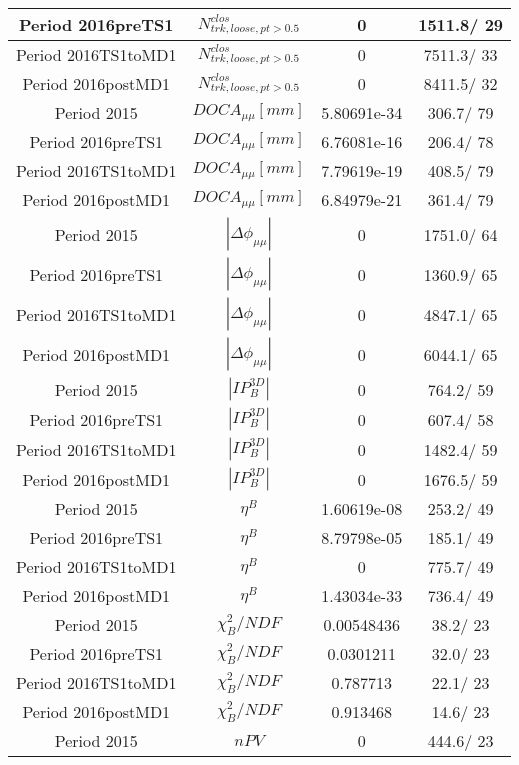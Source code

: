\documentclass{article}
\begin{document}
\begin{longtable}{c|c|c|c}
\hline
 Period 2016preTS1 & $N^{clos}_{trk, loose, pt>0.5}$ & 0 & 1511.8/ 29\\
\hline
 Period 2016TS1toMD1 & $N^{clos}_{trk, loose, pt>0.5}$ & 0 & 7511.3/ 33\\
\hline
 Period 2016postMD1 & $N^{clos}_{trk, loose, pt>0.5}$ & 0 & 8411.5/ 32\\
\hline
 Period 2015 & $DOCA_{\mu\mu} [mm]$ & 5.80691e-34 & 306.7/ 79\\
\hline
 Period 2016preTS1 & $DOCA_{\mu\mu} [mm]$ & 6.76081e-16 & 206.4/ 78\\
\hline
 Period 2016TS1toMD1 & $DOCA_{\mu\mu} [mm]$ & 7.79619e-19 & 408.5/ 79\\
\hline
 Period 2016postMD1 & $DOCA_{\mu\mu} [mm]$ & 6.84979e-21 & 361.4/ 79\\
\hline
 Period 2015 & $|\Delta\phi_{\mu\mu}|$ & 0 & 1751.0/ 64\\
\hline
 Period 2016preTS1 & $|\Delta\phi_{\mu\mu}|$ & 0 & 1360.9/ 65\\
\hline
 Period 2016TS1toMD1 & $|\Delta\phi_{\mu\mu}|$ & 0 & 4847.1/ 65\\
\hline
 Period 2016postMD1 & $|\Delta\phi_{\mu\mu}|$ & 0 & 6044.1/ 65\\
\hline
 Period 2015 & $|IP_{B}^{3D}|$ & 0 & 764.2/ 59\\
\hline
 Period 2016preTS1 & $|IP_{B}^{3D}|$ & 0 & 607.4/ 58\\
\hline
 Period 2016TS1toMD1 & $|IP_{B}^{3D}|$ & 0 & 1482.4/ 59\\
\hline
 Period 2016postMD1 & $|IP_{B}^{3D}|$ & 0 & 1676.5/ 59\\
\hline
 Period 2015 & $\eta^{B}$ & 1.60619e-08 & 253.2/ 49\\
\hline
 Period 2016preTS1 & $\eta^{B}$ & 8.79798e-05 & 185.1/ 49\\
\hline
 Period 2016TS1toMD1 & $\eta^{B}$ & 0 & 775.7/ 49\\
\hline
 Period 2016postMD1 & $\eta^{B}$ & 1.43034e-33 & 736.4/ 49\\
\hline
 Period 2015 & $\chi^{2}_{B}/NDF$ & 0.00548436 &  38.2/ 23\\
\hline
 Period 2016preTS1 & $\chi^{2}_{B}/NDF$ & 0.0301211 &  32.0/ 23\\
\hline
 Period 2016TS1toMD1 & $\chi^{2}_{B}/NDF$ & 0.787713 &  22.1/ 23\\
\hline
 Period 2016postMD1 & $\chi^{2}_{B}/NDF$ & 0.913468 &  14.6/ 23\\
\hline
 Period 2015 & $nPV$ & 0 & 444.6/ 23\\

\end{longtable}
\end{document}
